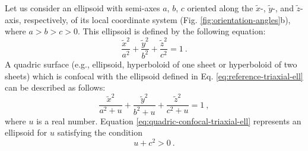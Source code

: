 \documentclass[gmd, manuscript]{copernicus}
\begin{document}
Let us consider an ellipsoid with semi-axes $a$, $b$, $c$ oriented along
the $\tilde{x}$-, $\tilde{y}$-, and $\tilde{z}$-axis, respectively,
of its local coordinate system (Fig. \ref{fig:orientation-angles}b), where $a > b > c > 0$.
This ellipsoid is defined by the following equation:
\begin{equation}
\frac{\tilde{x}^{2}}{a^{2}} + \frac{\tilde{y}^{2}}{b^{2}} + \frac{\tilde{z}^{2}}{c^{2}} = 1 \: .
\label{eq:reference-triaxial-ell}
\end{equation}
A quadric surface (e.g., ellipsoid, hyperboloid of one sheet or
hyperboloid of two sheets) which is confocal with the ellipsoid
defined in Eq. \ref{eq:reference-triaxial-ell} can be
described as follows:
\begin{equation}
\frac{\tilde{x}^{2}}{a^{2} + u} + \frac{\tilde{y}^{2}}{b^{2} + u} + \frac{\tilde{z}^{2}}{c^{2} + u} = 1 \: ,
\label{eq:quadric-confocal-triaxial-ell}
\end{equation}
where $u$ is a real number. Equation \ref{eq:quadric-confocal-triaxial-ell}
represents an ellipsoid for $u$ satisfying the condition
\begin{equation}
u + c^{2} > 0 \: .
\label{eq:condition-triaxial-ell}
\end{equation}
\end{document}

